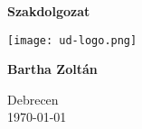 \begin{titlepage}
	\begin{center}
		\vspace*{1cm}
		
		\textbf{\large{Szakdolgozat}}
		
		\vfill
		
		\texttt{[image: ud-logo.png]}
		
		\vfill
		
		\textbf{Bartha Zoltán}
		
		\vspace{0.8cm}
		
		Debrecen\\
		\today
		
	\end{center}
\end{titlepage}